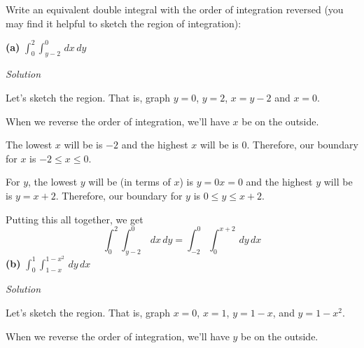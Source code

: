 \documentclass{article}
\newcommand{\Solution}{\textit{Solution}}
\begin{document}
Write an equivalent double integral with the order of integration reversed (you may find it helpful to sketch the region of integration):

\textbf{(a)} $\displaystyle \int_0^2\int_{y-2}^0\,dx\,dy$

\Solution

Let's sketch the region. That is, graph $y=0$, $y=2$, $x=y-2$ and $x=0$.
\begin{center}
\end{center}
When we reverse the order of integration, we'll have $x$ be on the outside.

The lowest $x$ will be is $-2$ and the highest $x$ will be is $0$. Therefore, our boundary for $x$ is $-2\leq x \leq 0$.

For $y$, the lowest $y$ will be (in terms of $x$) is $y=0x=0$ and the highest $y$ will be is $y=x+2$. Therefore, our boundary for $y$ is $0\leq y \leq x+2$.

Putting this all together, we get
\begin{equation*}
\boxed{\int_0^2\int_{y-2}^0\,dx\,dy=\int_{-2}^0\int_0^{x+2}\,dy\,dx}
\end{equation*}
\textbf{(b)} $\displaystyle \int_0^1\int_{1-x}^{1-x^2}\,dy\,dx$

\Solution

Let's sketch the region. That is, graph $x=0$, $x=1$, $y=1-x$, and $y=1-x^2$.
\begin{center}
\end{center}
When we reverse the order of integration, we'll have $y$ be on the outside.
\end{document}

